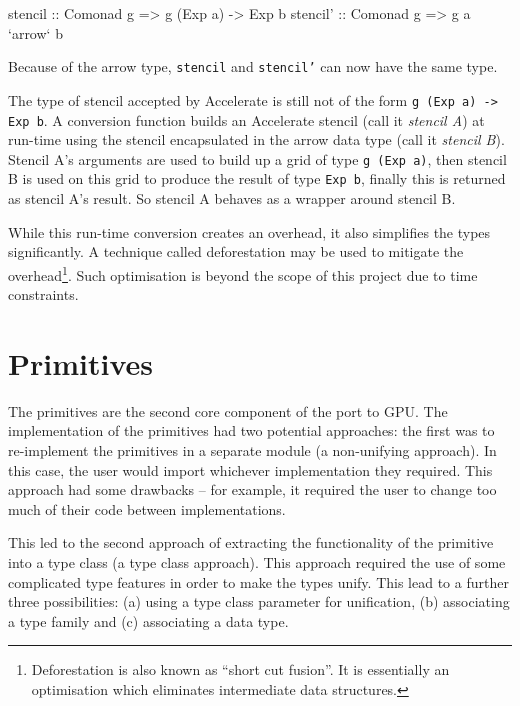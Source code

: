 \documentclass[
    12pt,
    a4paper,
    twoside,
    openright,
    ]{scrbook}
\begin{document}
\begin{hflisting}[label={lst:arrow-sten}, caption=Here we see the type the
  stencil must have in Accelerate (\texttt{stencil}) and the type we can
  generalise to using the \texttt{arrow} type (\texttt{stencil'}).]
stencil :: Comonad g => g (Exp a) -> Exp b
stencil' :: Comonad g => g a `arrow` b
\end{hflisting}

Because of the arrow type, \texttt{stencil} and \texttt{stencil'} can now have
the same type.

The type of stencil accepted by Accelerate is still not of the form \texttt{g
  (Exp a) -\textgreater{} Exp b}. A conversion function builds an Accelerate
stencil (call it \emph{stencil A}) at run-time using the stencil encapsulated in
the arrow data type (call it \emph{stencil B}). Stencil A's arguments are used
to build up a grid of type \texttt{g (Exp a)}, then stencil B is used on this
grid to produce the result of type \texttt{Exp b}, finally this is returned as
stencil A's result. So stencil A behaves as a wrapper around stencil B.

While this run-time conversion creates an overhead, it also simplifies the types
significantly. A technique called deforestation may be used to mitigate the
overhead\footnote{Deforestation is also known as ``short cut fusion''. It is
  essentially an optimisation which eliminates intermediate data
  structures.}. Such optimisation is beyond the scope of this project due to
time constraints.

\section{Primitives}
\label{sec:prims}

The primitives are the second core component of the port to GPU. The
implementation of the primitives had two potential approaches: the first was to
re-implement the primitives in a separate module (a non-unifying approach). In
this case, the user would import whichever implementation they required. This
approach had some drawbacks -- for example, it required the user to change too
much of their code between implementations.

This led to the second approach of extracting the functionality of the primitive
into a type class (a type class approach). This approach required the use of
some complicated type features in order to make the types unify. This lead to a
further three possibilities: (a) using a type class parameter for unification,
(b) associating a type family and (c) associating a data type.
\end{document}
